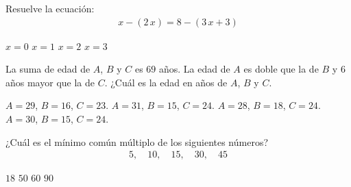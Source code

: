 \documentclass[12pt, letter]{exam}
\begin{document}
\begin{multicols}{2}
\begin{questions}
\begin{choices}
    \end{choices}
    \question Resuelve la ecuación:
    \begingroup
    \abovedisplayskip=0pt
    \belowdisplayskip=-10pt
    \begin{align*}
    x - ( 2 \, x) = 8 - (3 \, x + 3)
    \end{align*}
    \endgroup
    \begin{choices}
        \choice $x = 0$
        \choice $x = 1$
        \choice $x = 2$
        \choice $x = 3$
    \end{choices}
    \question La suma de edad de $A$, $B$ y $C$ es $69$ años. La edad de $A$ es doble que la de $B$ y $6$ años mayor que la de $C$. ¿Cuál es la edad en años de $A$, $B$ y $C$.
    \begin{choices}
        \choice $A = 29$, $B = 16$, $C = 23$.
        \choice $A = 31$, $B = 15$, $C = 24$.
        \choice $A = 28$, $B = 18$, $C = 24$.
        \choice $A = 30$, $B = 15$, $C = 24$.
    \end{choices}
    \question ¿Cuál es el mínimo común múltiplo de los siguientes números?
    \begingroup
    \abovedisplayskip=0pt
    \belowdisplayskip=-10pt
    \begin{align*}
    5, \quad 10, \quad 15, \quad 30, \quad 45
    \end{align*}
    \begin{choices}
        \choice $18$
        \choice $50$
        \choice $60$
        \choice $90$
    \end{choices}
\end{questions}
\end{multicols}
\end{document}
